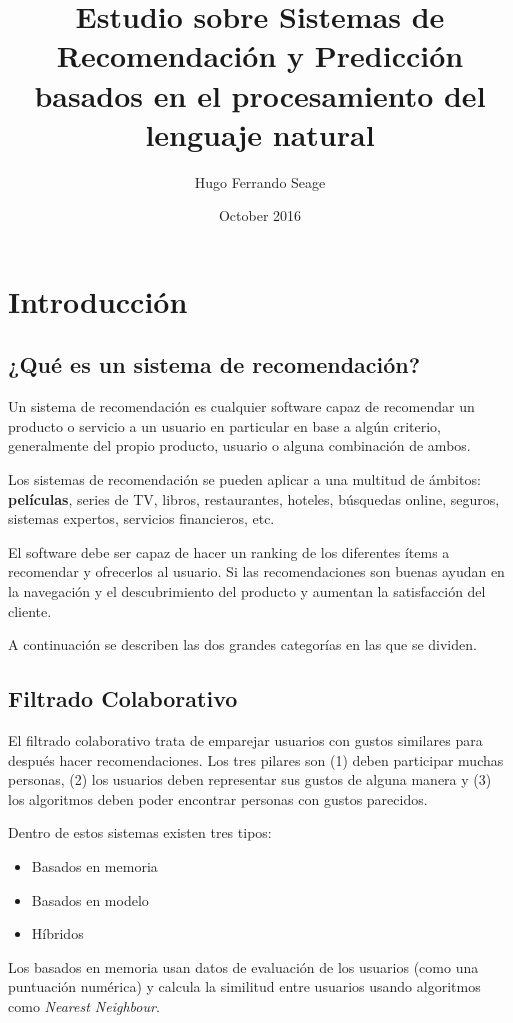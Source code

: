 \documentclass[withindex, glossary]{cam-thesis}
\title{Estudio sobre Sistemas de Recomendación y Predicción basados en el procesamiento del lenguaje natural}
\author{Hugo Ferrando Seage}
\date{October 2016}
\begin{document}
\frontmatter{}

\chapter{Introducción}
\section{¿Qué es un sistema de recomendación?}
Un sistema de recomendación es cualquier software capaz de recomendar un producto o servicio a un usuario en particular en base a algún criterio, generalmente del propio producto, usuario o alguna combinación de ambos.

Los sistemas de recomendación se pueden aplicar a una multitud de ámbitos: \textbf{películas}, series de TV, libros, restaurantes, hoteles, búsquedas online, seguros, sistemas expertos\cite{DBLP:journals/corr/ChenOG15}, servicios financieros\cite{Felfernig:2007:VFS:1620113.1620117}, etc.\

El software debe ser capaz de hacer un ranking de los diferentes ítems a recomendar y ofrecerlos al usuario. Si las recomendaciones son buenas ayudan en la navegación y el descubrimiento del producto y aumentan la satisfacción del cliente.

A continuación se describen las dos grandes categorías en las que se dividen.

\section{Filtrado Colaborativo}
El filtrado colaborativo trata de emparejar usuarios con gustos similares para después hacer recomendaciones. Los tres pilares son (1) deben participar muchas personas, (2) los usuarios deben representar sus gustos de alguna manera y (3) los algoritmos deben poder encontrar personas con gustos parecidos.\cite{TerveenHill2001}

Dentro de estos sistemas existen tres tipos:

\begin{itemize}
    \item Basados en memoria
    \item Basados en modelo
    \item Híbridos
\end{itemize}

Los basados en memoria usan datos de evaluación de los usuarios (como una puntuación numérica) y calcula la similitud entre usuarios usando algoritmos como \textit{Nearest Neighbour}.
\end{document}
